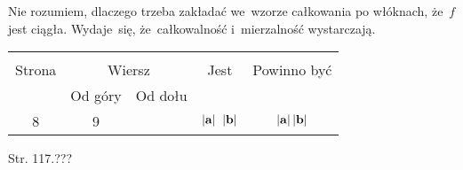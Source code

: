 \documentclass[a4paper,11pt]{article}
\begin{document}
\vspace{\spaceFour}



\start {} Nie rozumiem, dlaczego trzeba zakładać we~wzorze
całkowania po włóknach, że~$f$ jest ciągła. Wydaje~się,
że~całkowalność i~mierzalność wystarczają.







\begin{center}

  \begin{tabular}{|c|c|c|c|c|}
    \hline
    & \multicolumn{2}{c|}{} & & \\
    Strona & \multicolumn{2}{c|}{Wiersz} & Jest
                              & Powinno być \\ \cline{2-3}
    & Od góry & Od dołu & & \\
    \hline
    8   &  9 & & $| \mathbf{a} | \;\; | \mathbf{b} |$
           & $| \mathbf{a} | \, | \mathbf{b} |$ \\
    \hline
  \end{tabular}

\end{center}


\vspace{\spaceTwo}













Str. 117.???





\end{document}
